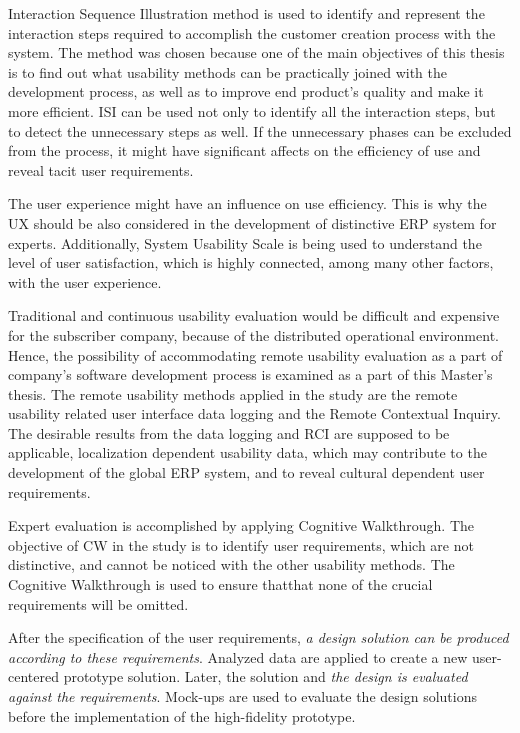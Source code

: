 \documentclass[12pt,a4paper,oneside,pdftex]{report}
\begin{document}
Interaction Sequence Illustration method is used to identify and represent the interaction steps required to accomplish the customer creation process with the system. The method was chosen because one of the main objectives of this thesis is to find out what usability methods can be practically joined with the development process, as well as to improve end product's quality and make it more efficient. ISI can be used not only to identify all the interaction steps, but to detect the unnecessary steps as well. If the unnecessary phases can be excluded from the process, it might have significant affects on the efficiency of use and reveal tacit user requirements. 

The user experience might have an influence on use efficiency. This is why the UX should be also considered in the development of distinctive ERP system for experts. Additionally, System Usability Scale is being used to understand the level of user satisfaction, which is highly connected, among many other factors, with the user experience.

Traditional and continuous usability evaluation would be difficult and expensive for the subscriber company, because of the distributed operational environment. Hence, the possibility of accommodating remote usability evaluation as a part of company's software development process is examined as a part of this Master's thesis. The remote usability methods applied in the study are the remote usability related user interface data logging and the Remote Contextual Inquiry. The desirable results from the data logging and RCI are supposed to be applicable, localization dependent usability data, which may contribute to the development of the global ERP system, and to reveal cultural dependent user requirements. 

Expert evaluation is accomplished by applying Cognitive Walkthrough. The objective of CW in the study is to identify user requirements, which are not distinctive, and cannot be noticed with the other usability methods. The Cognitive Walkthrough is used to ensure thatthat none of the crucial requirements will be omitted.

After the specification of the user requirements, \emph{a design solution can be produced according to these requirements}. Analyzed data are applied to create a new user-centered prototype solution. Later, the solution and \emph{the design is evaluated against the requirements}. Mock-ups are used to evaluate the design solutions before the implementation of the high-fidelity prototype.
\end{document}
